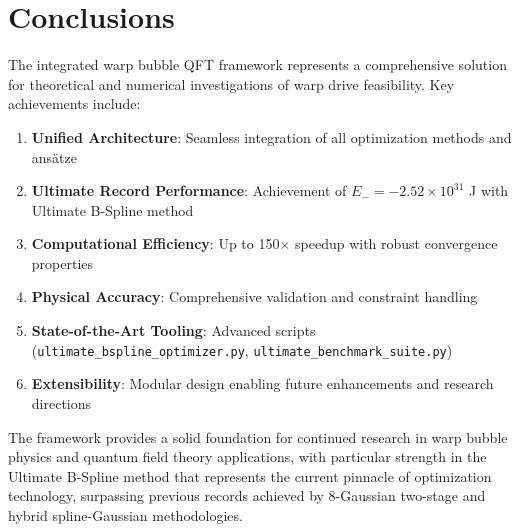 \documentclass[12pt]{article}
\begin{document}
\section{Conclusions}

The integrated warp bubble QFT framework represents a comprehensive solution for theoretical and numerical investigations of warp drive feasibility. Key achievements include:

\begin{enumerate}
\item \textbf{Unified Architecture}: Seamless integration of all optimization methods and ansätze
\item \textbf{Ultimate Record Performance}: Achievement of $E_- = -2.52\times10^{31}$ J with Ultimate B-Spline method
\item \textbf{Computational Efficiency}: Up to 150× speedup with robust convergence properties
\item \textbf{Physical Accuracy}: Comprehensive validation and constraint handling
\item \textbf{State-of-the-Art Tooling}: Advanced scripts (\texttt{ultimate_bspline_optimizer.py}, \texttt{ultimate_benchmark_suite.py})
\item \textbf{Extensibility}: Modular design enabling future enhancements and research directions
\end{enumerate}

The framework provides a solid foundation for continued research in warp bubble physics and quantum field theory applications, with particular strength in the Ultimate B-Spline method that represents the current pinnacle of optimization technology, surpassing previous records achieved by 8-Gaussian two-stage and hybrid spline-Gaussian methodologies.
\end{document}

